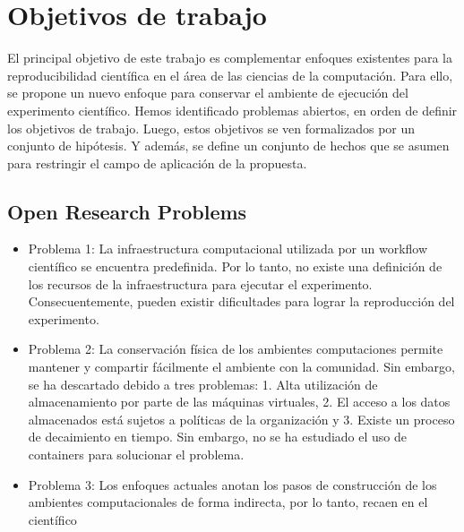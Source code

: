 
\chapter{Objetivos de trabajo}

\label{Chapter3} 

El principal objetivo de este trabajo es complementar enfoques existentes para la reproducibilidad científica en el área de las ciencias de la computación. Para ello, se propone un nuevo enfoque para conservar el ambiente de ejecución del experimento científico.
Hemos identificado problemas abiertos, en orden de definir los objetivos de trabajo. Luego, estos objetivos se ven formalizados por un conjunto de hipótesis. Y además, se define un conjunto de hechos que se asumen para restringir el campo de aplicación de la propuesta.



\section{Open Research Problems}
\begin{itemize}
	\item Problema 1: La infraestructura computacional utilizada por un workflow científico se encuentra predefinida. Por lo tanto, no existe una definición de los recursos de la infraestructura para ejecutar el experimento. Consecuentemente, pueden existir dificultades para lograr la reproducción del experimento. 
	\item Problema 2: La conservación física de los ambientes computaciones permite mantener y compartir fácilmente el ambiente con la comunidad. Sin embargo, se ha descartado debido a tres problemas: 
		1. Alta utilización de almacenamiento por parte de las máquinas virtuales, 
		2. El acceso a los datos almacenados está sujetos a políticas de la organización 
		y 3. Existe un proceso de decaimiento en tiempo.
		Sin embargo, no se ha estudiado el uso de containers para solucionar el problema.
	\item Problema 3: Los enfoques actuales anotan los pasos de construcción de los ambientes computacionales de forma indirecta, por lo tanto, recaen en el científico 
\end{itemize}





